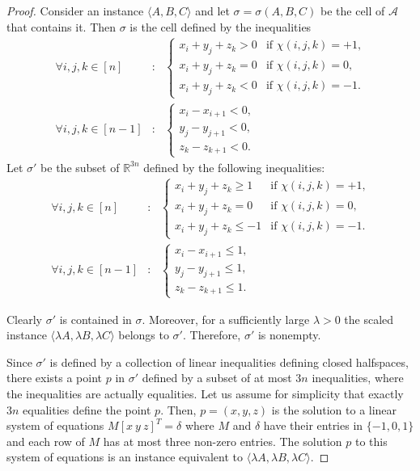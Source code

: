 \begin{proof}
Consider an instance $\langle A,B,C \rangle$ and let $\sigma=\sigma(A,B,C)$
be the cell of $\mathcal{A}$ that contains it.
Then $\sigma$ is the cell defined by the inequalities
\begin{align*}
	\forall{i,j,k}\in [n]&:~~~
	\begin{cases}
		x_i+y_j+z_k > 0 & \text{if $\chi(i,j,k)=+1$,}\\
		x_i+y_j+z_k = 0 & \text{if $\chi(i,j,k)=0$,}\\
		x_i+y_j+z_k < 0 & \text{if $\chi(i,j,k)=-1$.}
	\end{cases}\\
	\forall{i,j,k}\in [n-1]&:~~~
		\begin{cases}
		x_i - x_{i+1}<0,\\
		y_j - y_{j+1}<0,\\
		z_k - z_{k+1}<0.
	\end{cases}
\end{align*}
Let $\sigma'$ be the subset of $\mathbb{R}^{3n}$ defined by the following inequalities:
\begin{align*}
	\forall{i,j,k}\in [n]&:~~~
	\begin{cases}
		x_i+y_j+z_k \geq 1 & \text{if $\chi(i,j,k)=+1$,}\\
		x_i+y_j+z_k = 0 & \text{if $\chi(i,j,k)=0$,}\\
		x_i+y_j+z_k \leq -1 & \text{if $\chi(i,j,k)=-1$.}
	\end{cases}\\
	\forall{i,j,k}\in [n-1]&:~~~
		\begin{cases}
		x_i - x_{i+1} \leq 1,\\
		y_j - y_{j+1} \leq 1,\\
		z_k - z_{k+1} \leq 1.
	\end{cases}
\end{align*}

Clearly $\sigma'$ is contained in $\sigma$. Moreover, for a sufficiently large $\lambda>0$
the scaled instance $\langle \lambda A,\lambda B,\lambda C \rangle$ belongs to $\sigma'$.
Therefore, $\sigma'$ is nonempty.

Since $\sigma'$ is defined by a collection of linear inequalities defining closed halfspaces,
there exists a point $p$ in $\sigma'$ defined by a subset of at most $3n$ inequalities,
where the inequalities are actually equalities. Let us assume for simplicity that
exactly $3n$ equalities define the point $p$. Then, $p=(x,y,z)$ is the solution
to a linear system of equations $M [x~ y ~z]^T=\delta$
where $M$ and $\delta$ have their entries in $\{ -1,0,1 \}$
and each row of $M$ has at most three non-zero entries. The solution $p$ to this
system of equations is an instance equivalent to $\langle \lambda A,\lambda B,\lambda C \rangle$.


\end{proof}
